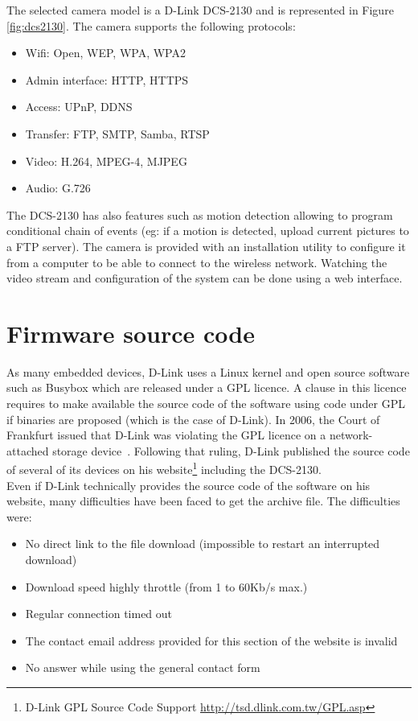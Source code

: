 The selected camera model is a D-Link DCS-2130 and is represented in Figure \ref{fig:dcs2130}. The camera supports the following protocols:\\

\begin{itemize}
\item Wifi: Open, WEP, WPA, WPA2
\item Admin interface: HTTP, HTTPS
\item Access: UPnP, DDNS
\item Transfer: FTP, SMTP, Samba, RTSP
\item Video: H.264, MPEG-4, MJPEG
\item Audio: G.726
\end{itemize}

The DCS-2130 has also features such as motion detection allowing to program conditional chain of events (eg: if a motion is detected, upload current pictures to a FTP server).
The camera is provided with an installation utility to configure it from a computer to be able to connect to the wireless network.
Watching the video stream and configuration of the system can be done using a web interface.

\section{Firmware source code}
\label{sec:dcs-gpl}

As many embedded devices, D-Link uses a Linux kernel and open source software such as Busybox which are released under a GPL licence.
A clause in this licence requires to make available the source code of the software using code under GPL if binaries are proposed (which is the case of D-Link).
In 2006, the Court of Frankfurt issued that D-Link was violating the GPL licence on a network-attached storage device~\cite{dlink-gpl-viol}.
Following that ruling, D-Link published the source code of several of its devices on his website\footnote{D-Link GPL Source Code Support \url{http://tsd.dlink.com.tw/GPL.asp}} including the DCS-2130.\\

Even if D-Link technically provides the source code of the software on his website, many difficulties have been faced to get the archive file.
The difficulties were:

\begin{itemize}
\item No direct link to the file download (impossible to restart an interrupted download)
\item Download speed highly throttle (from 1 to 60Kb/s max.)
\item Regular connection timed out
\item The contact email address provided for this section of the website is invalid
\item No answer while using the general contact form
\end{itemize}


